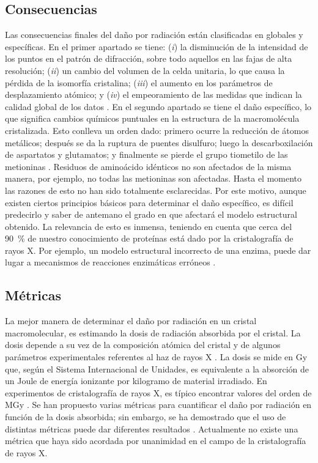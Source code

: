 \subsection{Consecuencias}
Las consecuencias finales del daño por radiación están clasificadas en globales y específicas. En el primer apartado se tiene: (\emph{i}) la disminución de la intensidad de los puntos en el patrón de difracción, sobre todo aquellos en las fajas de alta resolución; (\emph{ii}) un cambio del volumen de la celda unitaria, lo que causa la pérdida de la isomorfía cristalina; (\emph{iii}) el aumento en los parámetros de desplazamiento atómico; y (\emph{iv}) el empeoramiento de las medidas que indican la calidad global de los datos \cite{Teng2000}. En el segundo apartado se tiene el daño específico, lo que significa cambios químicos puntuales en la estructura de la macromolécula cristalizada. Esto conlleva un orden dado: primero ocurre la reducción de átomos metálicos; después se da la ruptura de puentes disulfuro; luego la descarboxilación de aspartatos y glutamatos; y finalmente se pierde el grupo tiometilo de las metioninas . Residuos de aminoácido idénticos no son afectados de la misma manera, por ejemplo, no todas las metioninas son afectadas. Hasta el momento las razones de esto no han sido totalmente esclarecidas. Por este motivo, aunque existen ciertos principios básicos para determinar el daño específico, es difícil predecirlo y saber de antemano el grado en que afectará el modelo estructural obtenido. La relevancia de esto es inmensa, teniendo en cuenta que cerca del \SI{90}{\percent} de nuestro conocimiento de proteínas está dado por la cristalografía de rayos X. Por ejemplo, un modelo estructural incorrecto de una enzima, puede dar lugar a mecanismos de reacciones enzimáticas erróneos .  %

\subsection{Métricas}
La mejor manera de determinar el daño por radiación en un cristal macromolecular, es estimando la dosis de radiación absorbida por el cristal. La dosis depende a su vez de la composición atómica del cristal y de algunos parámetros experimentales referentes al haz de rayos X . La dosis se mide en \si{\gray} que, según el Sistema Internacional de Unidades, es equivalente a la absorción de un Joule de energía ionizante por kilogramo de material irradiado. En experimentos de cristalografía de rayos X, es típico encontrar valores del orden de \si{\mega\gray} . Se han propuesto varias métricas para cuantificar el daño por radiación en función de la dosis absorbida; sin embargo, se ha demostrado que el uso de distintas métricas puede dar diferentes resultados . Actualmente no existe una métrica que haya sido acordada por unanimidad en el campo de la cristalografía de rayos X. 

